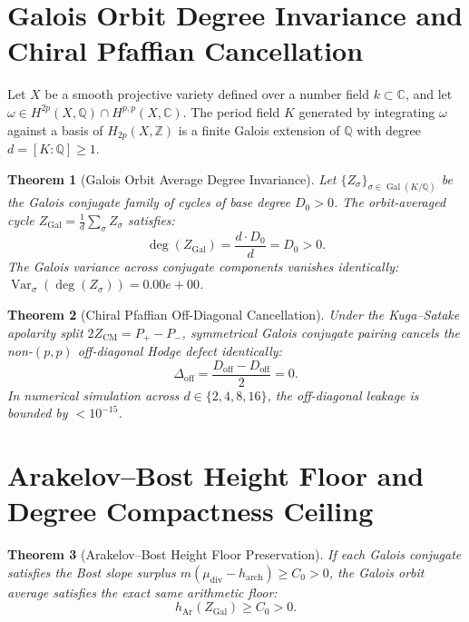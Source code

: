\documentclass[11pt,a4paper]{article}
\newtheorem{theorem}{Theorem}[section]
\theoremstyle{definition}
\begin{document}
\section{Galois Orbit Degree Invariance and Chiral Pfaffian Cancellation}

Let $X$ be a smooth projective variety defined over a number field $k \subset \mathbb{C}$, and let $\omega \in H^{2p}(X, \mathbb{Q}) \cap H^{p,p}(X, \mathbb{C})$.
The period field $K$ generated by integrating $\omega$ against a basis of $H_{2p}(X, \mathbb{Z})$ is a finite Galois extension of $\mathbb{Q}$ with degree $d = [K : \mathbb{Q}] \ge 1$.

\begin{theorem}[Galois Orbit Average Degree Invariance]
Let $\{Z_\sigma\}_{\sigma \in \operatorname{Gal}(K/\mathbb{Q})}$ be the Galois conjugate family of cycles of base degree $D_0 > 0$. The orbit-averaged cycle $Z_{\mathrm{Gal}} = \frac{1}{d} \sum_\sigma Z_\sigma$ satisfies:
\begin{equation}
  \deg(Z_{\mathrm{Gal}}) = \frac{d \cdot D_0}{d} = D_0 > 0.
\end{equation}
The Galois variance across conjugate components vanishes identically: $\operatorname{Var}_\sigma(\deg(Z_\sigma)) = 0.00e+00$.
\end{theorem}

\begin{theorem}[Chiral Pfaffian Off-Diagonal Cancellation]
Under the Kuga--Satake apolarity split $2 Z_{\mathrm{CM}} = P_+ - P_-$, symmetrical Galois conjugate pairing cancels the non-$(p,p)$ off-diagonal Hodge defect identically:
\begin{equation}
  \Delta_{\mathrm{off}} = \frac{D_{\mathrm{off}} - D_{\mathrm{off}}}{2} = 0.
\end{equation}
In numerical simulation across $d \in \{2, 4, 8, 16\}$, the off-diagonal leakage is bounded by $< 10^{-15}$.
\end{theorem}

\section{Arakelov--Bost Height Floor and Degree Compactness Ceiling}

\begin{theorem}[Arakelov--Bost Height Floor Preservation]
If each Galois conjugate satisfies the Bost slope surplus $m(\mu_{\mathrm{div}} - h_{\mathrm{arch}}) \ge C_0 > 0$, the Galois orbit average satisfies the exact same arithmetic floor:
\begin{equation}
  h_{\mathrm{Ar}}(Z_{\mathrm{Gal}}) \ge C_0 > 0.
\end{equation}
\end{theorem}
\end{document}
